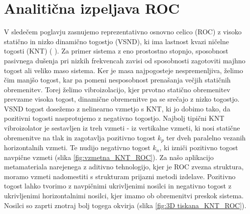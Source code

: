     
\newpage
\chapter{Analitična izpeljava ROC}\label{sec:ROC_statika}

    V sledečem poglavju zasnujemo reprezentativno osnovno celico (ROC) z visoko statično in nizko dinamično togostjo (VSND), ki ima lastnost kvazi ničelne togosti (KNT) (\cite{dalela2022design, fan2020design, cai2020design} ). Za primer sistema z eno prostostno stopnjo, sposobnost pasivnega dušenja pri nizkih frekvencah zavisi od sposobnosti zagotoviti majhno togost ali veliko maso sistema. Ker je masa najpogosteje nespremenljiva, želimo čim manjšo togost, kar pa pomeni nesposobnost prenašanja večjih statičnih obremenitev. Torej želimo vibroizolacijo, kjer prvotno statično obremenitev prevzame visoka togost, dinamične obremenitve pa se srečajo z nizko togostjo. VSND togost dosežemo z nelinearno vzmetjo s KNT, ki jo dobimo tako, da pozitivni togosti nasprotujemo z negativno togostjo. Najbolj tipični KNT vibroizolator \cite{lan2014design} je sestavljen iz treh vzmeti - iz vertikalne vzmeti, ki nosi statične obremenitve na tlak in zagotavlja pozitivno togost $k_p$ ter dveh paralelno vezanih horizontalnih vzmeti. Te nudijo negativno togost $k_n$, ki izniči pozitivno togost navpične vzmeti (slika \ref{fig:vzmetna_KNT_ROC}). Za našo aplikacijo metamateriala narejenega z aditivno tehnologijo, kjer je ROC zvezna struktura, moramo vzmeti nadomestiti s strukturam prijazni metodi izdelave. Pozitivno togost lahko tvorimo z navpičnimi ukrivljenimi nosilci in negativno togost z ukrivljenimi horizontalnimi nosilci, kjer imamo ob obremenitvi preskok sistema. Nosilci so zaprti znotraj bolj togega okvirja (slika \ref{fig:3D tiskana_KNT_ROC}).
